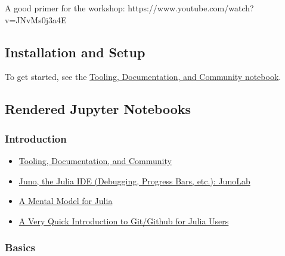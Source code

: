 \documentclass[11pt]{article}
\providecommand{\tightlist}{%
      \setlength{\itemsep}{0pt}\setlength{\parskip}{0pt}}
\begin{document}
A good primer for the workshop:
https://www.youtube.com/watch?v=JNvMs0j3a4E

    \subsection{Installation and Setup}\label{installation-and-setup}

To get started, see the
\href{http://ucidatascienceinitiative.github.io/IntroToJulia/Html/ToolingDocumentationCommunity}{Tooling,
Documentation, and Community notebook}.

    \subsection{Rendered Jupyter
Notebooks}\label{rendered-jupyter-notebooks}

\subsubsection{Introduction}\label{introduction}

\begin{itemize}
\tightlist
\item
  \href{http://ucidatascienceinitiative.github.io/IntroToJulia/Html/ToolingDocumentationCommunity}{Tooling,
  Documentation, and Community}
\item
  \href{http://docs.junolab.org/latest/}{Juno, the Julia IDE (Debugging,
  Progress Bars, etc.): JunoLab}
\item
  \href{http://ucidatascienceinitiative.github.io/IntroToJulia/Html/JuliaMentalModel}{A
  Mental Model for Julia}
\item
  \href{http://ucidatascienceinitiative.github.io/IntroToJulia/Html/GithubIntroduction}{A
  Very Quick Introduction to Git/Github for Julia Users}
\end{itemize}

\subsubsection{Basics}\label{basics}
\end{document}
